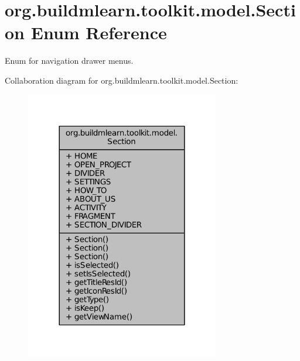 \hypertarget{enumorg_1_1buildmlearn_1_1toolkit_1_1model_1_1Section}{\section{org.\-buildmlearn.\-toolkit.\-model.\-Section Enum Reference}
\label{enumorg_1_1buildmlearn_1_1toolkit_1_1model_1_1Section}
}


Enum for navigation drawer menus.  




Collaboration diagram for org.\-buildmlearn.\-toolkit.\-model.\-Section\-:
\nopagebreak
\begin{figure}[H]
\begin{center}
\leavevmode
\includegraphics[width=240pt]{db/d84/enumorg_1_1buildmlearn_1_1toolkit_1_1model_1_1Section__coll__graph}
\end{center}
\end{figure}
